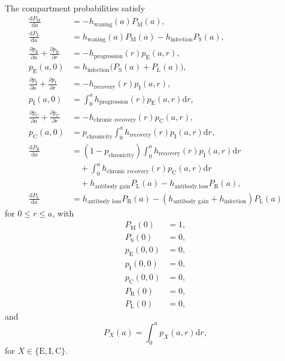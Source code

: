 \documentclass[12pt]{article}
\newcommand{\md}{\mathrm{d}}
\begin{document}
The compartment probabilities satisfy
\begin{equation}
  \begin{split}
    \frac{\md P_{\mathrm{M}}}{\md a}
    &= - h_{\text{waning}}(a) P_{\mathrm{M}}(a),
    \\
    \frac{\md P_{\mathrm{S}}}{\md a}
    &= h_{\text{waning}}(a) P_{\mathrm{M}}(a)
    - h_{\text{infection}} P_{\mathrm{S}}(a),
    \\
    \frac{\partial p_{\mathrm{E}}}{\partial a}
    + \frac{\partial p_{\mathrm{E}}}{\partial r}
    &= - h_{\text{progression}}(r) p_{\mathrm{E}}(a, r),
    \\
    p_{\mathrm{E}}(a, 0) &= h_{\text{infection}}
    \big(P_{\mathrm{S}}(a) + P_{\mathrm{L}}(a)\big),
    \\
    \frac{\partial p_{\mathrm{I}}}{\partial a}
    + \frac{\partial p_{\mathrm{I}}}{\partial r}
    &= - h_{\text{recovery}}(r) p_{\mathrm{I}}(a, r),
    \\
    p_{\mathrm{I}}(a, 0) &=
    \int_0^a h_{\text{progression}}(r)
    p_{\mathrm{E}}(a, r) \md r,
    \\
    \frac{\partial p_{\mathrm{C}}}{\partial a}
    + \frac{\partial p_{\mathrm{C}}}{\partial r}
    &= - h_{\text{chronic recovery}}(r) p_{\mathrm{C}}(a, r),
    \\
    p_{\mathrm{C}}(a, 0) &=
    p_{\text{chronicity}}
    \int_0^a h_{\text{recovery}}(r) p_{\mathrm{I}}(a, r) \md r,
    \\
    \frac{\md P_{\mathrm{R}}}{\md a}
    &=
    \left(1 - p_{\text{chronicity}}\right)
    \int_0^a h_{\text{recovery}}(r) p_{\mathrm{I}}(a, r) \md r
    \\ & \quad {}
    + \int_0^a h_{\text{chronic recovery}}(r) p_{\mathrm{C}}(a, r) \md r
    \\ & \quad {}
    + h_{\text{antibody gain}} P_{\mathrm{L}}(a)
    - h_{\text{antibody loss}} P_{\mathrm{R}}(a),
    \\
    \frac{\md P_{\mathrm{L}}}{\md a}
    &=
    h_{\text{antibody loss}} P_{\mathrm{R}}(a)
    - \left(h_{\text{antibody gain}} + h_{\text{infection}}\right)
    P_{\mathrm{L}}(a)
  \end{split}
\end{equation}
for $0 \leq r \leq a$,
with
\begin{equation}
  \begin{split}
    P_{\mathrm{M}}(0) &= 1,
    \\
    P_{\mathrm{S}}(0) &= 0,
    \\
    p_{\mathrm{E}}(0, 0) &= 0,
    \\
    p_{\mathrm{I}}(0, 0) &= 0,
    \\
    p_{\mathrm{C}}(0, 0) &= 0,
    \\
    P_{\mathrm{R}}(0) &= 0,
    \\
    P_{\mathrm{L}}(0) &= 0,
  \end{split}
\end{equation}
and
\begin{equation}
  P_X(a) = \int_0^a p_X(a, r) \md r,
\end{equation}
for $X \in \{\mathrm{E}, \mathrm{I}, \mathrm{C}\}$.
\end{document}
